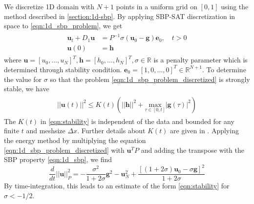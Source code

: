 We discretize 1D domain with $N+1$ points in a uniform grid on $[0,1]$ using the method described in \autoref{section:1d-sbp}. By applying SBP-SAT discretization in space to \autoref{eqn:1d_sbp_problem}, we get
\begin{align}
    \begin{split}
        \boldsymbol{u}_t + D_1\boldsymbol{u} &= P^{-1}\sigma(\boldsymbol{u}_0 - \boldsymbol{g}) \boldsymbol{e}_0, \quad t > 0\\
        \boldsymbol{u}(0) &= \boldsymbol{h}
    \end{split}
    \label{eqn:1d_sbp_problem_discretized}
\end{align}
where $\boldsymbol{u} = [u_0,\dots,u_N]^T, \boldsymbol{h} = [h_0,\dots,h_N]^T, \sigma \in \mathbb{R}$ is a penalty parameter which is determined through stability condition. $\boldsymbol{e}_0 = [1,0,\dots,0]^T\in\mathbb{R}^{N+1}$. To determine the value for $\sigma$ so that the problem \autoref{eqn:1d_sbp_problem_discretized} is strongly stable, we have 
\begin{align}
    \begin{split}
        ||\boldsymbol{u}(t)||^2 \leq K(t)(||\boldsymbol{h}||^2 + \underset{\tau \in [0,t]}{\text{max}}|\boldsymbol{g}(\tau)|^2)
    \end{split}
    \label{eqn:stability}
\end{align}
The $K(t)$ in \autoref{eqn:stability} is independent of the data and bounded for any finite $t$ and meshsize $\Delta x$. Further details about $K(t)$ are given in \citep{SVARD201417,gustafsson1995time}.
Applying the energy method by multiplying the equation \autoref{eqn:1d_sbp_problem_discretized} with $\boldsymbol{u}^TP$ and adding the transpose with the SBP property \autoref{eqn:1d_sbp}, we find
\begin{equation}
    \frac{d}{dt}||\boldsymbol{u}||_P^2 = - \frac{\sigma^2}{1+2\sigma}\boldsymbol{g}^2 - \boldsymbol{u}_N^2 + \frac{[(1+2\sigma)\boldsymbol{u}_0 - \sigma\boldsymbol{g}]^2}{1+2\sigma}
\end{equation}
By time-integration, this leads to an estimate of the form \autoref{eqn:stability} for $\sigma < -1/2$.


